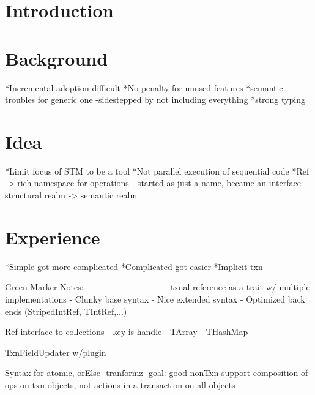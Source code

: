 \documentclass[preprint]{sigplanconf}
\begin{document}

\terms
\xterms

\keywords
\xkeywords

\section{Introduction}
\label{intro}


\section{Background}
\label{background}
*Incremental adoption difficult
*No penalty for unused features
*semantic troubles for generic one
   -sidestepped by not including everything
*strong typing


\section{Idea}
%
*Limit focus of STM to be a tool
*Not parallel execution of sequential code
*Ref -> rich namespace for operations
   - started as just a name, became an interface
   - structural realm -> semantic realm

\section{Experience}
%
*Simple got more complicated
*Complicated got easier
*Implicit txn


Green Marker Notes:
~~~~~~~~~~~~~~~~~~~
txnal reference as a trait
    w/ multiple implementations
  - Clunky base syntax
  - Nice extended syntax
  - Optimized back ends (StripedIntRef, TIntRef,...)

Ref interface to collections
  - key is handle
  - TArray
  - THashMap

TxnFieldUpdater w/plugin

Syntax for atomic, orElse
  -tranformz
  -goal: good nonTxn support
        composition of ops on txn objects, 
        not actions in a transaction on all objects

\end{document}
